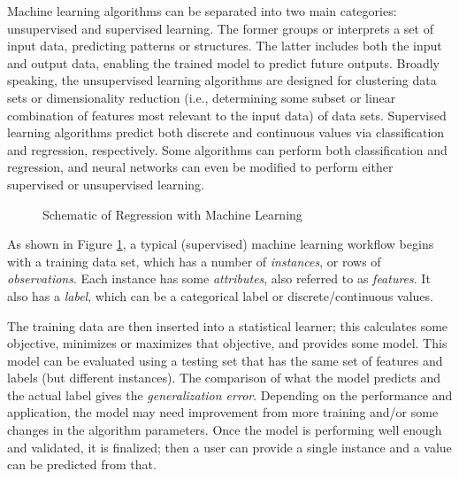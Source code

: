Machine learning algorithms can be separated into two main categories:
unsupervised and supervised learning.  The former groups or interprets a set of
input data, predicting patterns or structures. The latter includes both the
input and output data, enabling the trained model to predict future outputs.
Broadly speaking, the unsupervised learning algorithms are designed for
clustering data sets or dimensionality reduction (i.e., determining some subset
or linear combination of features most relevant to the input data) of data
sets.  Supervised learning algorithms predict both discrete and continuous
values via classification and regression, respectively. Some algorithms can
perform both classification and regression, and neural networks can even be
modified to perform either supervised or unsupervised
learning.\cite{elements_stats} 
\\
\begin{figure}[!htb]
  \caption{Schematic of Regression with Machine Learning}
  \label{fig:supervised}
\end{figure}

As shown in Figure \ref{fig:supervised}, a typical (supervised) machine
learning workflow begins with a training data set, which has a number of
\textit{instances}, or rows of \textit{observations}.  Each instance has some
\textit{attributes}, also referred to as \textit{features}. It also has a
\textit{label}, which can be a categorical label or discrete/continuous values.  

The training data are then inserted into a statistical learner; this calculates
some objective, minimizes or maximizes that objective, and provides some model.
This model can be evaluated using a testing set that has the same set of
features and labels (but different instances). The comparison of what the
model predicts and the actual label gives the \textit{generalization error}.
Depending on the performance and application, the model may need improvement
from more training and/or some changes in the algorithm parameters. Once the
model is performing well enough and validated, it is finalized; then a user can
provide a single instance and a value can be predicted from that. 

